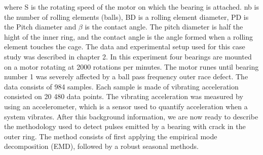\documentclass[../Main/thesis.tex]{subfiles}
\begin{document}
where S is the rotating speed of the motor on which the bearing is attached. nb is the number of rolling elements (balls), BD is a rolling element diameter, PD is the Pitch diameter and $\beta$ is the contact angle. The pitch diameter is half the hight of the inner ring, and the contact angle is the angle formed when a rolling element touches the cage. The data and experimental setup used for this case study was described in chapter 2. In this experiment four bearings are mounted on a motor rotating at 2000 rotations per minutes. The motor runes until bearing number 1 was severely affected by a ball pass frequency outer race defect. The data consists of 984 samples. Each sample is made of vibrating acceleration consisted on 20 480 data points. The vibrating acceleration was measured by using an accelerometer, which is a sensor used to quantify acceleration when a system vibrates. After this background information, we are now ready to describe the methodology used to detect pulses emitted by a bearing with crack in the outer ring.
\justify
The method consists of first applying the empirical mode decomposition (EMD), followed by a robust seasonal methods. 







\blankpage
\end{document}
